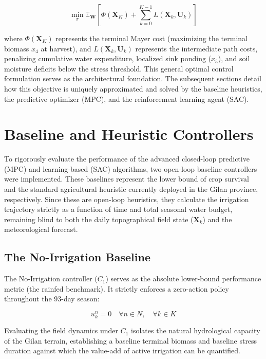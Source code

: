 \documentclass[11pt, a4paper]{article}
\begin{document}
\begin{equation}
    \min_{\pi} \mathbb{E}_{\mathbf{W}} \left[ \Phi(\mathbf{X}_K) + \sum_{k=0}^{K-1} L(\mathbf{X}_k, \mathbf{U}_k) \right]
\end{equation}

where $\Phi(\mathbf{X}_K)$ represents the terminal Mayer cost (maximizing the terminal biomass $x_4$ at harvest), and $L(\mathbf{X}_k, \mathbf{U}_k)$ represents the intermediate path costs, penalizing cumulative water expenditure, localized sink ponding ($x_5$), and soil moisture deficits below the stress threshold. This general optimal control formulation serves as the architectural foundation. The subsequent sections detail how this objective is uniquely approximated and solved by the baseline heuristics, the predictive optimizer (MPC), and the reinforcement learning agent (SAC).

\section{Baseline and Heuristic Controllers}

To rigorously evaluate the performance of the advanced closed-loop predictive (MPC) and learning-based (SAC) algorithms, two open-loop baseline controllers were implemented. These baselines represent the lower bound of crop survival and the standard agricultural heuristic currently deployed in the Gilan province, respectively. Since these are open-loop heuristics, they calculate the irrigation trajectory strictly as a function of time and total seasonal water budget, remaining blind to both the daily topographical field state ($\mathbf{X}_k$) and the meteorological forecast.

\subsection{The No-Irrigation Baseline}

The No-Irrigation controller ($C_1$) serves as the absolute lower-bound performance metric (the rainfed benchmark). It strictly enforces a zero-action policy throughout the 93-day season:

\begin{equation}
    u^n_k = 0 \quad \forall n \in N, \quad \forall k \in K
\end{equation}

Evaluating the field dynamics under $C_1$ isolates the natural hydrological capacity of the Gilan terrain, establishing a baseline terminal biomass and baseline stress duration against which the value-add of active irrigation can be quantified.
\end{document}
